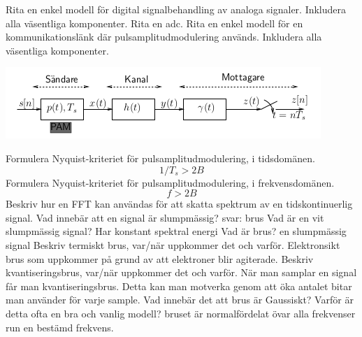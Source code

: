 \documentclass[a4paper,11pt]{article}
\begin{document}
\newline
\newline
Rita en enkel modell för digital signalbehandling av analoga signaler.  Inkludera alla 
väsentliga komponenter.
Rita en adc.
\newline
\newline
Rita en enkel modell för en kommunikationslänk där pulsamplitudmodulering används.  
Inkludera alla väsentliga komponenter.
\newline
\centerline{
\includegraphics[scale=0.7]{pam}
}
\newline
\newline
Formulera Nyquist-kriteriet för pulsamplitudmodulering, i tidsdomänen. 
$$1/T_s>2B$$
\newline
\newline
Formulera Nyquist-kriteriet för pulsamplitudmodulering, i frekvensdomänen.
$$f>2B$$
\newline
\newline
Beskriv hur en FFT kan användas för att skatta spektrum av en tidskontinuerlig signal.
\newline
\newline
Vad innebär att en signal är slumpmässig?  
svar: brus
\newline
\newline
Vad är en vit slumpmässig signal? 
Har konstant spektral energi
\newline
\newline
Vad är brus?
en slumpmässig signal
\newline
\newline
Beskriv termiskt brus, var/när uppkommer det och varför.
Elektronsikt brus som uppkommer på grund av att elektroner blir agiterade. 
\newline
\newline
Beskriv kvantiseringsbrus, var/när uppkommer det och varför.
När man samplar en signal får man kvantiseringsbrus. Detta kan man motverka genom att öka antalet bitar man använder för varje sample. 
\newline
\newline
Vad innebär det att brus är Gaussiskt? Varför är detta ofta en bra och vanlig modell?
bruset är normalfördelat övar alla frekvenser run en bestämd frekvens.
\end{document}
